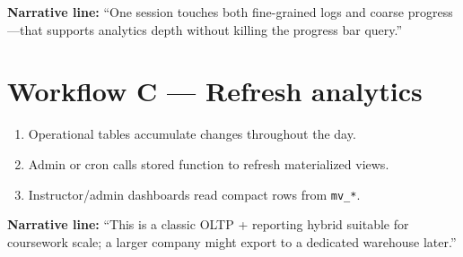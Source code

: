 \textbf{Narrative line:} ``One session touches both fine-grained logs and coarse progress---that supports analytics depth without killing the progress bar query.''

\section{Workflow C --- Refresh analytics}
\begin{enumerate}[leftmargin=*]
  \item Operational tables accumulate changes throughout the day.

  \item Admin or cron calls stored function to refresh materialized views.

  \item Instructor/admin dashboards read compact rows from \texttt{mv\_*}.

\end{enumerate}

\textbf{Narrative line:} ``This is a classic OLTP + reporting hybrid suitable for coursework scale; a larger company might export to a dedicated warehouse later.''
